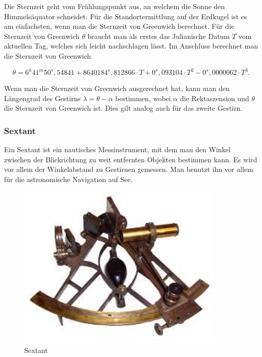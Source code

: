 Die Sternzeit geht vom Frühlungspunkt aus, an welchem die Sonne den Himmelsäquator schneidet.
Für die Standortermittlung auf der Erdkugel ist es am einfachsten, wenn man die Sternzeit von Greenwich berechnet. 
Für die Sternzeit von Greenwich $\theta$ braucht man als erstes das Julianische Datum $T$ vom aktuellen Tag, welches sich leicht nachschlagen lässt.
Im Anschluss berechnet man die Sternzeit von Greenwich

\[\theta = 6^h 41^m 50^s,54841 + 8640184^s,812866 \cdot T + 0^s,093104 \cdot T^2 - 0^s,0000062 \cdot T^3.\]

Wenn man die Sternzeit von Greenwich ausgerechnet hat, kann man den Längengrad des Gestirns $\lambda = \theta - \alpha$ bestimmen, wobei $\alpha$ die Rektaszension und $\theta$ die Sternzeit von Greenwich ist.
Dies gilt analog auch für das zweite Gestirn.
\subsubsection{Sextant}
Ein Sextant ist ein nautisches Messinstrument, mit dem man den Winkel zwischen der Blickrichtung zu weit entfernten Objekten bestimmen kann. Es wird vor allem der Winkelabstand zu Gestirnen gemessen. 
Man benutzt ihn vor allem für die astronomische Navigation auf See.

\begin{figure}
	\begin{center}
		\includegraphics[width=10cm]{papers/nav/bilder/sextant.jpg}
		\caption[Sextant]{Sextant}
	\end{center}
\end{figure}
